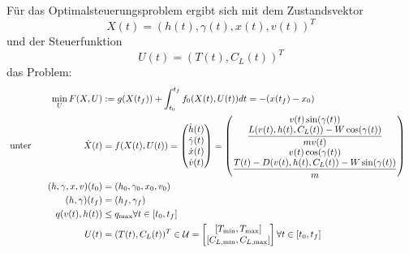 \begin{problem}\label{prob:MaxRF}
    Für das Optimalsteuerungsproblem ergibt sich mit dem Zustandsvektor
    \[X(t) = (h(t),\gamma(t),x(t),v(t))^T\]
    und der Steuerfunktion
    \[U(t) = (T(t),C_L(t))^T\]
    das Problem:
    \begin{align*}
        \min_{U} F(X,U) &:= g(X(t_f)) + \int_{t_0}^{t_f} f_0(X(t),U(t)) dt = -(x(t_f) - x_0) & & \\\
        \text{unter} \hspace{20mm} \dot{X}(t) &= f(X(t),U(t)) =     
         \begin{pmatrix}
         \dot{h}(t)  \\ 
         \dot{\gamma}(t)  \\ 
         \dot{x}(t)  \\ 
         \dot{v}(t)   \\ 
	 \end{pmatrix} 
        = 
        \begin{pmatrix}
            v(t) \sin(\gamma(t)) \\ 
            \dfrac{L(v(t),h(t),C_L(t)) - W \cos(\gamma(t))}{mv(t)} \\ 
            v(t) \cos(\gamma(t)) \\ 
            \dfrac{T(t) - D(v(t),h(t),C_L(t)) - W \sin(\gamma(t))}{m}
        \end{pmatrix} & & \\\
        (h,\gamma,x,v)(t_0) &= (h_0,\gamma_0,x_0,v_0) & & \\\
        (h,\gamma)(t_f) &= (h_f,\gamma_f) & & \\\
        q(v(t),h(t)) &\leq q_{\max}  \forall t \in [t_0,t_f]\\\
        U(t) &= (T(t),C_L(t))^T \in \mathcal{U} = \left[ 
        \begin{matrix}
            [T_{\min},T_{\max}] \\ 
            [C_{L, \min},C_{L, \max}]
        \end{matrix} 
        \right]  \forall t \in [t_0,t_f]
    \end{align*}
\end{problem}

